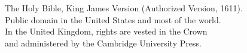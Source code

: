 \documentclass[twocolumn,paper=179mm:239mm,pagesize=auto,11pt,headinclude=on,openany,oneside]{scrbook}
\begin{document}
\onecolumn






\vfill
\begin{center}
\small
The Holy Bible, King James Version (Authorized Version, 1611).\\
Public domain in the United States and most of the world.\\
In the United Kingdom, rights are vested in the Crown\\
and administered by the Cambridge University Press.
\end{center}
\end{document}

